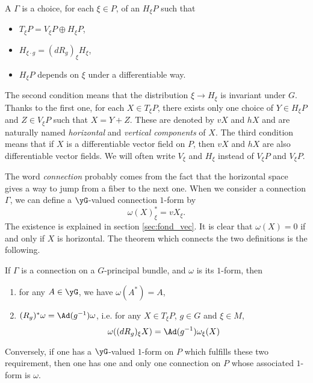 A  $\Gamma$ is a choice, for each $\xi\in P$, of an  $H_{\xi} P$ such that

\begin{itemize}
\item $T_{\xi} P=V_{\xi} P\oplus H_{\xi} P$,
\item $H_{\xi\cdot g}=(dR_g)_{\xi} H_{\xi}$,
\item $H_{\xi} P$ depends on $\xi$ under a differentiable way.
\end{itemize}
The second condition means that the distribution $\xi\to H_{\xi}$ is invariant under $G$. Thanks to the first one, for each $X\in T_{\xi} P$, there exists only one choice of $Y\in H_{\xi} P$ and $Z\in V_{\xi} P$ such that $X=Y+Z$. These are denoted by $vX$ and $hX$ and are naturally named \emph{horizontal} and \emph{vertical components} of $X$. The third condition means that if $X$ is a differentiable vector field on $P$, then $vX$ and $hX$ are also differentiable vector fields. We will often write $V_{\xi}$ and $H_{\xi}$ instead of $V_{\xi} P$ and $V_{\xi} P$.

The word \emph{connection} probably comes from the fact that the horizontal space gives a way to jump from a fiber to the next one. 
When we consider a connection $\Gamma$, we can define a $\yG$-valued connection $1$-form by 
\[
   \omega(X)^*_{\xi}=vX_{\xi}.
\]
The existence is explained in section \ref{sec:fond_vec}. It is clear that $\omega(X)=0$ if and only if $X$ is horizontal. The theorem which connects the two definitions is the following.

\begin{theorem}
If $\Gamma$ is a connection on a $G$-principal bundle, and $\omega$ is its $1$-form, then

\begin{enumerate}
\item\label{enuyai} for any $A\in\yG$, we have $\omega(A^*)=A$,
\item\label{enuyaii} $(R_g)^*\omega=\Ad(g^{-1})\omega$, i.e. for any $X\in T_{\xi} P$, $g\in G$ and $\xi\in M$,
\[
    \omega((dR_g)_{\xi} X)=\Ad(g^{-1})\omega_{\xi}(X)
\]
\end{enumerate}
Conversely, if one has a $\yG$-valued $1$-form on $P$ which fulfills these two requirement, then one has one and only one connection on $P$ whose associated $1$-form is $\omega$.

\end{theorem}

